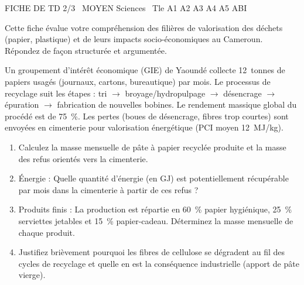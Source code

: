 \documentclass[11pt]{article}
\begin{document}
\begin{tcolorbox}[enhanced,colback=popink,colframe=popink,arc=10pt,boxrule=0pt,left=12pt,right=12pt,top=9pt,bottom=9pt]
{\color{white}\popxbold\small FICHE DE TD 2/3 \textbullet\ MOYEN \hfill Sciences \textbullet\ Tle A1 A2 A3 A4 A5 ABI\par}
\end{tcolorbox}
\vspace{4pt}
\noindent Cette fiche évalue votre compréhension des filières de valorisation des déchets (papier, plastique) et de leurs impacts socio-économiques au Cameroun. Répondez de façon structurée et argumentée.

\begin{exercice}
Un groupement d'intérêt économique (GIE) de Yaoundé collecte \SI{12}{tonnes} de papiers usagés (journaux, cartons, bureautique) par mois. Le processus de recyclage suit les étapes : tri $\rightarrow$ broyage/hydropulpage $\rightarrow$ désencrage $\rightarrow$ épuration $\rightarrow$ fabrication de nouvelles bobines. Le rendement massique global du procédé est de \SI{75}{\%}. Les pertes (boues de désencrage, fibres trop courtes) sont envoyées en cimenterie pour valorisation énergétique (PCI moyen \SI{12}{MJ/kg}).
\begin{enumerate}
    \item Calculez la masse mensuelle de pâte à papier recyclée produite et la masse des refus orientés vers la cimenterie.
    \item Énergie : Quelle quantité d'énergie (en GJ) est potentiellement récupérable par mois dans la cimenterie à partir de ces refus ?
    \item Produits finis : La production est répartie en \SI{60}{\%} papier hygiénique, \SI{25}{\%} serviettes jetables et \SI{15}{\%} papier-cadeau. Déterminez la masse mensuelle de chaque produit.
    \item Justifiez brièvement pourquoi les fibres de cellulose se dégradent au fil des cycles de recyclage et quelle en est la conséquence industrielle (apport de pâte vierge).
\end{enumerate}
\end{exercice}
\end{document}
